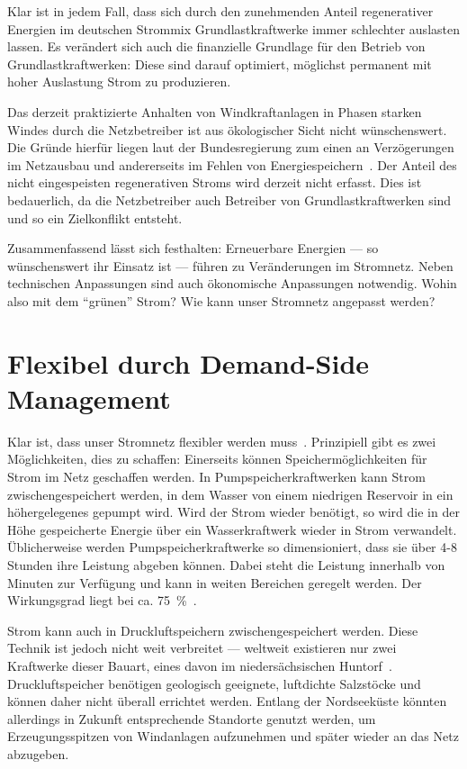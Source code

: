 \documentclass[logo]{fhgart}
\begin{document}
Klar ist in jedem Fall, dass sich durch den zunehmenden Anteil
regenerativer Energien im deutschen Strommix Grundlastkraftwerke immer
schlechter auslasten lassen.  Es verändert sich auch die finanzielle
Grundlage für den Betrieb von Grundlastkraftwerken: Diese sind darauf
optimiert, möglichst permanent mit hoher Auslastung Strom zu
produzieren. 

Das derzeit praktizierte Anhalten von Windkraftanlagen in Phasen starken
Windes durch die Netzbetreiber ist aus ökologischer Sicht nicht
wünschenswert. Die Gründe hierfür liegen laut der Bundesregierung zum
einen an Verzögerungen im Netzausbau und andererseits im Fehlen von
Energiespeichern~\cite{bundesreg2010kleineanfrage}. Der Anteil des nicht
eingespeisten regenerativen Stroms wird derzeit nicht erfasst. Dies ist
bedauerlich, da die Netzbetreiber auch Betreiber von
Grundlastkraftwerken sind und so ein Zielkonflikt entsteht.

Zusammenfassend lässt sich festhalten: Erneuerbare Energien --- so
wünschenswert ihr Einsatz ist --- führen zu Veränderungen im Stromnetz.
Neben technischen Anpassungen sind auch ökonomische Anpassungen
notwendig. Wohin also mit dem "`grünen"' Strom? Wie kann unser Stromnetz
angepasst werden?

\section{Flexibel durch Demand-Side Management}\label{sec:demand-side_management}

Klar ist, dass unser Stromnetz flexibler werden
muss~\cite{geller2010smartgrid}. Prinzipiell gibt es zwei Möglichkeiten,
dies zu schaffen: Einerseits können Speichermöglichkeiten für Strom im
Netz geschaffen werden. In Pumpspeicherkraftwerken kann Strom
zwischengespeichert werden, in dem Wasser von einem niedrigen Reservoir
in ein höhergelegenes gepumpt wird.  Wird der Strom wieder benötigt, so
wird die in der Höhe gespeicherte Energie über ein Wasserkraftwerk
wieder in Strom verwandelt.  Üblicherweise werden Pumpspeicherkraftwerke
so dimensioniert, dass sie über 4-8 Stunden ihre Leistung abgeben
können. Dabei steht die Leistung innerhalb von Minuten zur Verfügung und
kann in weiten Bereichen geregelt werden. Der Wirkungsgrad liegt bei ca.
75~\%~\cite[S. 175]{schwab06elektroenergiesysteme}.

Strom kann auch in Druckluftspeichern zwischengespeichert werden. Diese
Technik ist jedoch nicht weit verbreitet --- weltweit existieren nur
zwei Kraftwerke dieser Bauart, eines davon im niedersächsischen
Huntorf~\cite{web11huntorf}. Druckluftspeicher benötigen geologisch geeignete,
luftdichte Salzstöcke und können daher nicht überall errichtet werden.
Entlang der Nordseeküste könnten allerdings in Zukunft entsprechende
Standorte genutzt werden, um Erzeugungsspitzen von Windanlagen
aufzunehmen und später wieder an das Netz abzugeben. 
\end{document}
